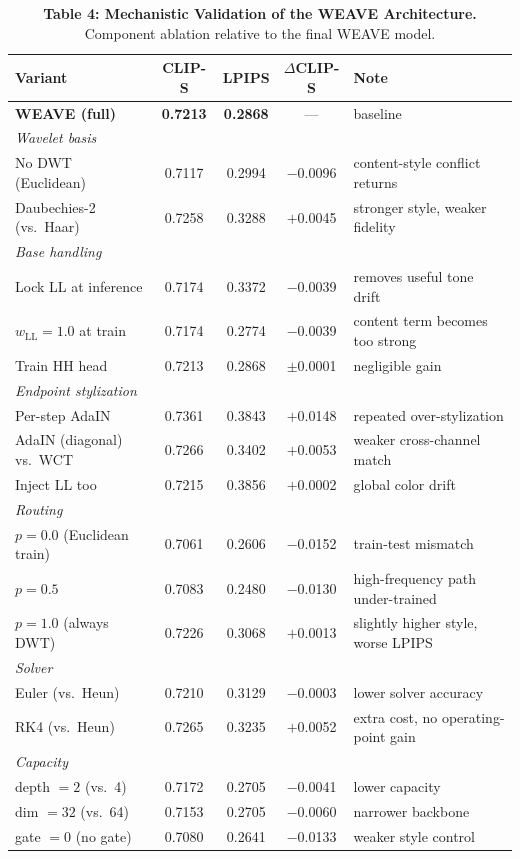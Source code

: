 \documentclass[10pt,letterpaper]{article}
\begin{document}
\begin{table}[h]
\centering
\caption{\textbf{Table 4: Mechanistic Validation of the WEAVE Architecture.} Component ablation relative to the final WEAVE model.}
\label{tab:ablation_supp}
\small
\setlength{\tabcolsep}{4pt}
\begin{tabular}{@{}lcccl@{}}
\toprule
Variant & CLIP-S & LPIPS & $\Delta$CLIP-S & Note \\
\midrule
\textbf{WEAVE (full)} & \textbf{0.7213} & \textbf{0.2868} & --- & baseline \\
\midrule
\multicolumn{5}{l}{\emph{Wavelet basis}} \\
\quad No DWT (Euclidean) & 0.7117 & 0.2994 & $-$0.0096 & content-style conflict returns \\
\quad Daubechies-2 (vs.\ Haar) & 0.7258 & 0.3288 & $+$0.0045 & stronger style, weaker fidelity \\
\midrule
\multicolumn{5}{l}{\emph{Base handling}} \\
\quad Lock LL at inference & 0.7174 & 0.3372 & $-$0.0039 & removes useful tone drift \\
\quad $w_{\text{LL}}=1.0$ at train & 0.7174 & 0.2774 & $-$0.0039 & content term becomes too strong \\
\quad Train HH head & 0.7213 & 0.2868 & $\pm$0.0001 & negligible gain \\
\midrule
\multicolumn{5}{l}{\emph{Endpoint stylization}} \\
\quad Per-step AdaIN & 0.7361 & 0.3843 & $+$0.0148 & repeated over-stylization \\
\quad AdaIN (diagonal) vs.\ WCT & 0.7266 & 0.3402 & $+$0.0053 & weaker cross-channel match \\
\quad Inject LL too & 0.7215 & 0.3856 & $+$0.0002 & global color drift \\
\midrule
\multicolumn{5}{l}{\emph{Routing}} \\
\quad $p=0.0$ (Euclidean train) & 0.7061 & 0.2606 & $-$0.0152 & train-test mismatch \\
\quad $p=0.5$ & 0.7083 & 0.2480 & $-$0.0130 & high-frequency path under-trained \\
\quad $p=1.0$ (always DWT) & 0.7226 & 0.3068 & $+$0.0013 & slightly higher style, worse LPIPS \\
\midrule
\multicolumn{5}{l}{\emph{Solver}} \\
\quad Euler (vs.\ Heun) & 0.7210 & 0.3129 & $-$0.0003 & lower solver accuracy \\
\quad RK4 (vs.\ Heun) & 0.7265 & 0.3235 & $+$0.0052 & extra cost, no operating-point gain \\
\midrule
\multicolumn{5}{l}{\emph{Capacity}} \\
\quad depth $=2$ (vs.\ 4) & 0.7172 & 0.2705 & $-$0.0041 & lower capacity \\
\quad dim $=32$ (vs.\ 64) & 0.7153 & 0.2705 & $-$0.0060 & narrower backbone \\
\quad gate $=0$ (no gate) & 0.7080 & 0.2641 & $-$0.0133 & weaker style control \\
\bottomrule
\end{tabular}
\end{table}
\end{document}
